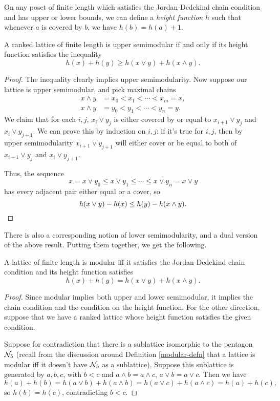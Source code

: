 \begin{appendices}
On any poset of finite length which satisfies the Jordan-Dedekind chain condition and has upper or lower bounds, we can define a \emph{height function} $h$ such that whenever $a$ is covered by $b$, we have $h(b) = h(a)+1$.

\begin{prop} A ranked lattice of finite length is upper semimodular if and only if its height function satisfies the inequality
\[
h(x) + h(y) \ge h(x \vee y) + h(x \wedge y).
\]
\end{prop}
\begin{proof} The inequality clearly implies upper semimodularity. Now suppose our lattice is upper semimodular, and pick maximal chains
\begin{align*}
x\wedge y &= x_0 < x_1 < \cdots < x_m = x,\\
x\wedge y &= y_0 < y_1 < \cdots < y_n = y.
\end{align*}
We claim that for each $i,j$, $x_i \vee y_j$ is either covered by or equal to $x_{i+1} \vee y_j$ and $x_i \vee y_{j+1}$. We can prove this by induction on $i,j$: if it's true for $i,j$, then by upper semimodularity $x_{i+1} \vee y_{j+1}$ will either cover or be equal to both of $x_{i+1} \vee y_j$ and $x_i \vee y_{j+1}$.

Thus, the sequence
\[
x = x \vee y_0 \le x \vee y_1 \le \cdots \le x \vee y_n = x \vee y
\]
has every adjacent pair either equal or a cover, so
\[
h(x \vee y) - h(x) \le h(y) - h(x \wedge y).\qedhere
\]
\end{proof}

There is also a corresponding notion of lower semimodularity, and a dual version of the above result. Putting them together, we get the following.

\begin{thm} A lattice of finite length is modular iff it satisfies the Jordan-Dedekind chain condition and its height function satisfies
\[
h(x) + h(y) = h(x\vee y) + h(x \wedge y).
\]
\end{thm}
\begin{proof} Since modular implies both upper and lower semimodular, it implies the chain condition and the condition on the height function. For the other direction, suppose that we have a ranked lattice whose height function satisfies the given condition.

Suppose for contradiction that there is a sublattice isomorphic to the pentagon $\mathcal{N}_5$ (recall from the discussion around Definition \ref{modular-defn} that a lattice is modular iff it doesn't have $\mathcal{N}_5$ as a sublattice). Suppose this sublattice is generated by $a,b,c$, with $b < c$ and $a \wedge b = a \wedge c$, $a \vee b = a \vee c$. Then we have
\[
h(a) + h(b) = h(a\vee b) + h(a \wedge b) = h(a\vee c) + h(a \wedge c) = h(a) + h(c),
\]
so $h(b) = h(c)$, contradicting $b < c$.
\end{proof}


\end{appendices}
